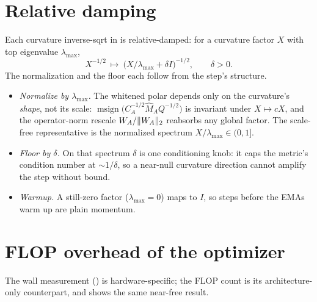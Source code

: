 \documentclass[11pt]{article}
\DeclarePairedDelimiter{\norm}{\lVert}{\rVert}
\DeclareMathOperator{\polar}{msign}          %
\theoremstyle{plain}
\theoremstyle{definition}
\theoremstyle{remark}
\begin{document}
\section{Relative damping}
\label{app:damping}
Each curvature inverse-sqrt in  is relative-damped: for a curvature factor $X$ with top eigenvalue $\lambda_{\max}$,
\begin{equation*}
  X^{-1/2}\ \longmapsto\ \big(X/\lambda_{\max}+\delta I\big)^{-1/2},\qquad \delta>0 .
\end{equation*}
The normalization and the floor each follow from the step's structure.
\begin{itemize}[leftmargin=1.5em,itemsep=2pt,topsep=2pt]
  \item \emph{Normalize by $\lambda_{\max}$.} The whitened polar depends only on the curvature's \emph{shape}, not its scale: $\polar\!\big(C_A^{-1/2}\hat M_A Q^{-1/2}\big)$ is invariant under $X\mapsto cX$, and the operator-norm rescale $W_A/\norm{W_A}_2$ reabsorbs any global factor. The scale-free representative is the normalized spectrum $X/\lambda_{\max}\in(0,1]$.
  \item \emph{Floor by $\delta$.} On that spectrum $\delta$ is one conditioning knob: it caps the metric's condition number at ${\sim}1/\delta$, so a near-null curvature direction cannot amplify the step without bound.
  \item \emph{Warmup.} A still-zero factor ($\lambda_{\max}=0$) maps to $I$, so steps before the EMAs warm up are plain momentum.
\end{itemize}

\section{FLOP overhead of the optimizer}
\label{app:flops}
The wall measurement () is hardware-specific; the FLOP count is
its architecture-only counterpart, and shows the same near-free result.
\end{document}
